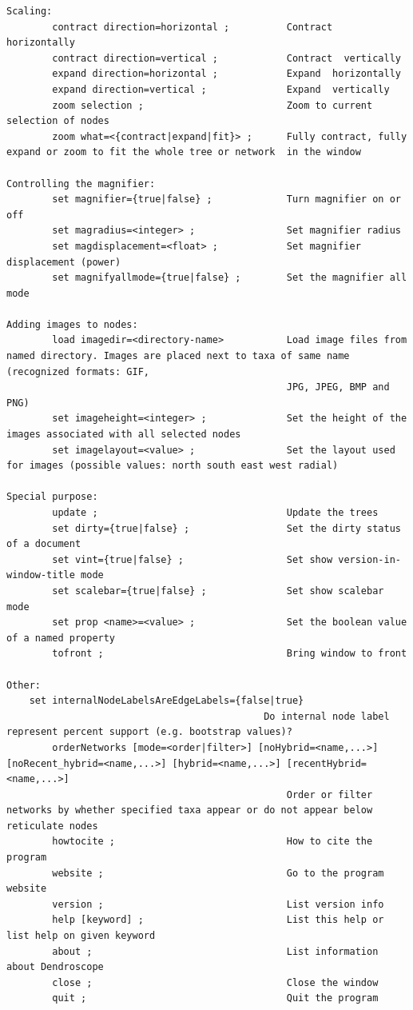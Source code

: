 \documentclass[11pt]{article}
\begin{document}
\begin{verbatim}
Scaling:
        contract direction=horizontal ;          Contract  horizontally
        contract direction=vertical ;            Contract  vertically
        expand direction=horizontal ;            Expand  horizontally
        expand direction=vertical ;              Expand  vertically
        zoom selection ;                         Zoom to current selection of nodes
        zoom what=<{contract|expand|fit}> ;      Fully contract, fully expand or zoom to fit the whole tree or network  in the window                        

Controlling the magnifier:
        set magnifier={true|false} ;             Turn magnifier on or off
        set magradius=<integer> ;                Set magnifier radius
        set magdisplacement=<float> ;            Set magnifier displacement (power)
        set magnifyallmode={true|false} ;        Set the magnifier all mode

Adding images to nodes:
        load imagedir=<directory-name>           Load image files from named directory. Images are placed next to taxa of same name (recognized formats: GIF, 
                                                 JPG, JPEG, BMP and PNG)
        set imageheight=<integer> ;              Set the height of the images associated with all selected nodes
        set imagelayout=<value> ;                Set the layout used for images (possible values: north south east west radial)

Special purpose:
        update ;                                 Update the trees
        set dirty={true|false} ;                 Set the dirty status of a document
        set vint={true|false} ;                  Set show version-in-window-title mode
        set scalebar={true|false} ;              Set show scalebar mode
        set prop <name>=<value> ;                Set the boolean value of a named property
        tofront ;                                Bring window to front

Other:
	set internalNodeLabelsAreEdgeLabels={false|true}
	                                         Do internal node label represent percent support (e.g. bootstrap values)?
        orderNetworks [mode=<order|filter>] [noHybrid=<name,...>] [noRecent_hybrid=<name,...>] [hybrid=<name,...>] [recentHybrid=<name,...>]
                                                 Order or filter networks by whether specified taxa appear or do not appear below reticulate nodes
        howtocite ;                              How to cite the program
        website ;                                Go to the program website
        version ;                                List version info
        help [keyword] ;                         List this help or list help on given keyword 
        about ;                                  List information about Dendroscope
        close ;                                  Close the window
        quit ;                                   Quit the program

\end{verbatim}
\normalsize
\end{document}
